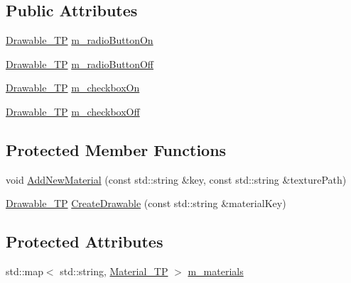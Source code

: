 \subsection*{Public Attributes}
\begin{DoxyCompactItemize}
\item 
\mbox{\hyperlink{classec__gui_1_1_theme_a91d9c5c68bc50cc0f1470d141a6a231b}{Drawable\+\_\+\+TP}} \mbox{\hyperlink{classec__gui_1_1_theme_a1251e17fe9288485f2a63fedd0bb4871}{m\+\_\+radio\+Button\+On}}
\item 
\mbox{\hyperlink{classec__gui_1_1_theme_a91d9c5c68bc50cc0f1470d141a6a231b}{Drawable\+\_\+\+TP}} \mbox{\hyperlink{classec__gui_1_1_theme_a17440ed33f45c710bcb182798ab84a18}{m\+\_\+radio\+Button\+Off}}
\item 
\mbox{\hyperlink{classec__gui_1_1_theme_a91d9c5c68bc50cc0f1470d141a6a231b}{Drawable\+\_\+\+TP}} \mbox{\hyperlink{classec__gui_1_1_theme_a453840d9a4f95aff4e3c57b401fe5755}{m\+\_\+checkbox\+On}}
\item 
\mbox{\hyperlink{classec__gui_1_1_theme_a91d9c5c68bc50cc0f1470d141a6a231b}{Drawable\+\_\+\+TP}} \mbox{\hyperlink{classec__gui_1_1_theme_a8b5f9bca215498ff954599c0ac79db0a}{m\+\_\+checkbox\+Off}}
\end{DoxyCompactItemize}
\subsection*{Protected Member Functions}
\begin{DoxyCompactItemize}
\item 
void \mbox{\hyperlink{classec__gui_1_1_theme_a019c4706c8fc1ce44bb167d363506b5b}{Add\+New\+Material}} (const std\+::string \&key, const std\+::string \&texture\+Path)
\item 
\mbox{\hyperlink{classec__gui_1_1_theme_a91d9c5c68bc50cc0f1470d141a6a231b}{Drawable\+\_\+\+TP}} \mbox{\hyperlink{classec__gui_1_1_theme_aeb8406fe5324c6fe494dc948f0d60b71}{Create\+Drawable}} (const std\+::string \&material\+Key)
\end{DoxyCompactItemize}
\subsection*{Protected Attributes}
\begin{DoxyCompactItemize}
\item 
std\+::map$<$ std\+::string, \mbox{\hyperlink{classec__gui_1_1_theme_ad0272419db6e28fc59f972460e5260ad}{Material\+\_\+\+TP}} $>$ \mbox{\hyperlink{classec__gui_1_1_theme_ad4231ac8abe5b877c1997b8d94edf648}{m\+\_\+materials}}
\end{DoxyCompactItemize}


